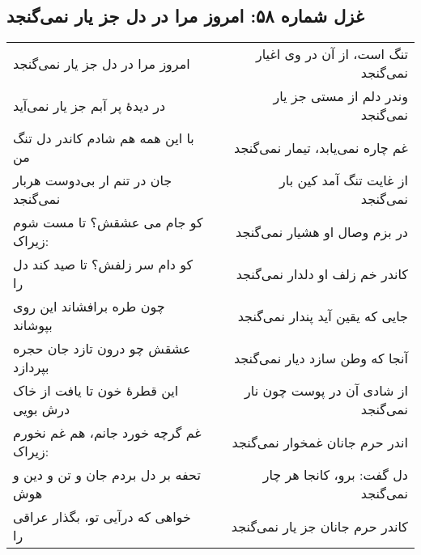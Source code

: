 \begin{center}
\section*{غزل شماره ۵۸: امروز مرا در دل جز یار نمی‌گنجد}
\label{sec:058}
\begin{longtable}{l p{0.5cm} r}
امروز مرا در دل جز یار نمی‌گنجد
&&
تنگ است، از آن در وی اغیار نمی‌گنجد
\\
در دیدهٔ پر آبم جز یار نمی‌آید
&&
وندر دلم از مستی جز یار نمی‌گنجد
\\
با این همه هم شادم کاندر دل تنگ من
&&
غم چاره نمی‌یابد، تیمار نمی‌گنجد
\\
جان در تنم ار بی‌دوست هربار نمی‌گنجد
&&
از غایت تنگ آمد کین بار نمی‌گنجد
\\
کو جام می عشقش؟ تا مست شوم زیراک:
&&
در بزم وصال او هشیار نمی‌گنجد
\\
کو دام سر زلفش؟ تا صید کند دل را
&&
کاندر خم زلف او دلدار نمی‌گنجد
\\
چون طره برافشاند این روی بپوشاند
&&
جایی که یقین آید پندار نمی‌گنجد
\\
عشقش چو درون تازد جان حجره بپردازد
&&
آنجا که وطن سازد دیار نمی‌گنجد
\\
این قطرهٔ خون تا یافت از خاک درش بویی
&&
از شادی آن در پوست چون نار نمی‌گنجد
\\
غم گرچه خورد جانم، هم غم نخورم زیراک:
&&
اندر حرم جانان غمخوار نمی‌گنجد
\\
تحفه بر دل بردم جان و تن و دین و هوش
&&
دل گفت: برو، کانجا هر چار نمی‌گنجد
\\
خواهی که درآیی تو، بگذار عراقی را
&&
کاندر حرم جانان جز یار نمی‌گنجد
\\
\end{longtable}
\end{center}

